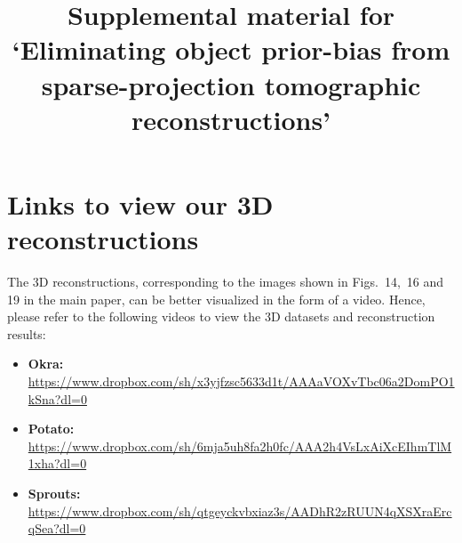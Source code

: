 \documentclass{article}
\title{Supplemental material for `Eliminating object prior-bias from sparse-projection
tomographic reconstructions'}
\begin{document}
\maketitle

\tableofcontents
\newpage

\newpage
\section{Links to view our 3D reconstructions}
The 3D reconstructions, corresponding to the images shown in Figs.~14,~16 and 19 in the main paper, can be better visualized in the form of a video. Hence, please refer to the following videos to view the 3D datasets and reconstruction results:

\begin{itemize}
\item \textbf{Okra:} \\

  \url{https://www.dropbox.com/sh/x3yjfzsc5633d1t/AAAaVOXvTbc06a2DomPO1kSna?dl=0}\\
\item \textbf{Potato:} \\

  \url{https://www.dropbox.com/sh/6mja5uh8fa2h0fc/AAA2h4VsLxAiXcEIhmTlM1xha?dl=0}\\
\item \textbf{Sprouts:}\\

  \url{https://www.dropbox.com/sh/qtgeyckvbxiaz3s/AADhR2zRUUN4qXSXraErcqSea?dl=0}\\
\end{itemize}

\newpage
\end{document}
